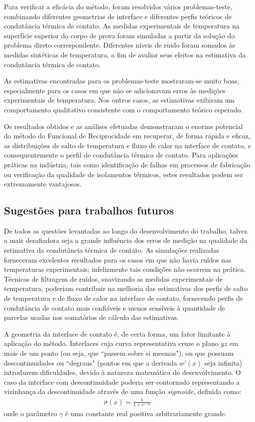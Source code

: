 Para verificar a eficácia do método, foram resolvidos vários problemas-teste, combinando diferentes geometrias de interface e diferentes perfis teóricos de condutância térmica de contato. As medidas experimentais de temperatura na superfície superior do corpo de prova foram simuladas a partir da solução do problema direto correspondente. Diferentes níveis de ruido foram somados às medidas sintéticas de temperatura, a fim de avaliar seus efeitos na estimativa da condutância térmica de contato.

As estimativas encontradas para os problemas-teste mostraram-se muito boas, especialmente para os casos em que não se adicionavam erros às medições experimentais de temperatura. Nos outros casos, as estimativas exibiram um comportamento qualitativo consistente com o comportamento teórico esperado.

Os resultados obtidos e as análises efetuadas demonstraram o enorme potencial do método do Funcional de Reciprocidade em recuperar, de forma rápida e eficaz, as distribuições de salto de temperatura e fluxo de calor na interface de contato, e consequentemente o perfil de condutância térmica de contato. Para aplicações práticas na indústria, tais como identificação de falhas em processos de fabricação ou verificação da qualidade de isolamentos térmicos, estes resultados podem ser extremamente vantajosos.


\subsection{Sugestões para trabalhos futuros}

De todos as questões levantadas ao longo do desenvolvimento do trabalho, talvez a mais desafiadora seja a grande influência dos erros de medição na qualidade da estimativa da condutância térmica de contato. As simulações realizadas forneceram excelentes resultados para os casos em que não havia ruídos nas temperaturas experimentais; infelizmente tais condições não ocorrem na prática. Técnicas de filtragem de ruídos, suavizando as medidas experimentais de temperatura, poderiam contribuir na melhoria das estimativas dos perfis de salto de temperatura e de fluxo de calor na interface de contato, fornecendo perfis de condutância de contato mais confiáveis e menos sensíveis à quantidade de parcelas usadas nos somatórios de cálculo das estimativas.

A geometria da interface de contato é, de certa forma, um fator limitante à aplicação do método. Interfaces cuja curva representativa cruze o plano $yz$ em mais de um ponto (ou seja, que ``passem sobre si mesmas"), ou que possuam descontinuidades ou ``degraus" (pontos em que a derivada $w'(x)$ seja infinita) introduzem dificuldades, devido à natureza matemática do desenvolvimento. O caso da interface com descontinuidade poderia ser contornado representando a vizinhança da descontinuidade através de uma função \textit{sigmoide}, definida como:
\begin{align}
\sigma(x) = \frac{1}{1 + e^{-\gamma x}}
\end{align}
onde o parâmetro $\gamma$ é uma constante real positiva arbitrariamente grande.

